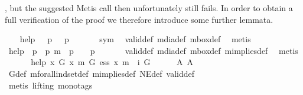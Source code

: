 \begin{isabellebody}
\begin{isamarkuptext}
 , but the suggested Metis call then unfortunately still fails. In order to 
 obtain a full verification of the proof we therefore introduce some further lemmata.%
\end{isamarkuptext}%
\isamarkuptrue%
\ \ \isamarkupfalse%
\ help{}{\isacharcolon}\ {\isachardoublequoteopen}{\isacharbrackleft}{\isasymdiamond}\ {\isacharparenleft}{\isasymbox}\ p{\isacharparenright}{\isacharbrackright}\ {\isasymLongrightarrow}\ {\isacharbrackleft}{\isasymbox}\ p{\isacharbrackright}{\isachardoublequoteclose}\ \isanewline
%
\isadelimproof
\ \ \ \ %
\endisadelimproof
%
\isatagproof
{}\isamarkupfalse%
\ sym\ \isamarkupfalse%
\ valid{\isacharunderscore}def\ mdia{\isacharunderscore}def\ mbox{\isacharunderscore}def\ \isamarkupfalse%
\ metis%
\endisatagproof
{\isafoldproof}%
%
\isadelimproof
\isanewline
%
\endisadelimproof
\isanewline
\ \ \isamarkupfalse%
\ help{}{\isacharcolon}\ {\isachardoublequoteopen}{\isacharbrackleft}{\isasymdiamond}\ p{\isacharbrackright}\ {\isasymand}\ {\isacharbrackleft}p\ m{\isasymRightarrow}\ {\isasymbox}\ p{\isacharbrackright}\ {\isasymLongrightarrow}\ {\isacharbrackleft}{\isasymdiamond}\ {\isacharparenleft}{\isasymbox}\ p{\isacharparenright}{\isacharbrackright}{\isachardoublequoteclose}\ \isanewline
%
\isadelimproof
\ \ \ \ %
\endisadelimproof
%
\isatagproof
{}\isamarkupfalse%
\ valid{\isacharunderscore}def\ mdia{\isacharunderscore}def\ mbox{\isacharunderscore}def\ mimplies{\isacharunderscore}def\ \isamarkupfalse%
\ metis%
\endisatagproof
{\isafoldproof}%
%
\isadelimproof
\isanewline
%
\endisadelimproof
\ \ \isanewline
\ \ \isamarkupfalse%
\ help{}{\isacharcolon}\ {\isachardoublequoteopen}{\isasymforall}x{\isachardot}\ {\isacharbrackleft}G\ x\ m{\isasymRightarrow}\ G\ ess\ x\ m{\isasymRightarrow}\ {\isasymbox}\ {\isacharparenleft}{\isasymexists}i\ G{\isacharparenright}{\isacharbrackright}{\isachardoublequoteclose}\isanewline
%
\isadelimproof
\ \ \ \ %
\endisadelimproof
%
\isatagproof
{}\isamarkupfalse%
\ A{}\ A{}\ \isamarkupfalse%
\ G{\isacharunderscore}def\ mforall{\isacharunderscore}indset{\isacharunderscore}def\ mimplies{\isacharunderscore}def\ NE{\isacharunderscore}def\ valid{\isacharunderscore}def\isanewline
\ \ \ \ \isamarkupfalse%
\ {\isacharparenleft}metis\ {\isacharparenleft}lifting{\isacharcomma}\ mono{\isacharunderscore}tags{\isacharparenright}{\isacharparenright}%

\end{isabellebody}
